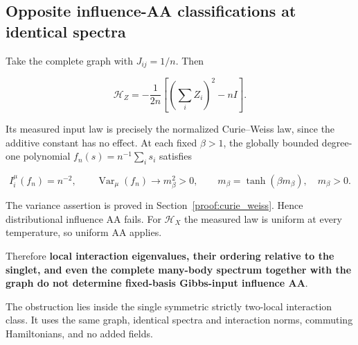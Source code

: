 \subsection{Opposite influence-AA classifications at identical
spectra}\label{quant:sec-3}

Take the complete graph with \(J_{ij}=1/n\). Then

\[
\mathcal H_Z=-\frac1{2n}\left[\left(\sum_iZ_i\right)^2-nI\right].
\]

Its measured input law is precisely the normalized Curie--Weiss law,
since the additive constant has no effect. At each fixed \(\beta>1\),
the globally bounded degree-one polynomial \(f_n(s)=n^{-1}\sum_i s_i\)
satisfies

\[
I_i^\mu(f_n)=n^{-2},\qquad
\operatorname{Var}_\mu(f_n)\longrightarrow m_\beta^2>0,
\qquad m_\beta=\tanh(\beta m_\beta),\quad m_\beta>0.
\]

The variance assertion is proved in
Section~\ref{proof:curie_weiss}. Hence distributional influence AA
fails. For \(\mathcal H_X\) the measured law is uniform at every
temperature, so uniform AA applies.

Therefore \textbf{local interaction eigenvalues, their ordering relative
to the singlet, and even the complete many-body spectrum together with
the graph do not determine fixed-basis Gibbs-input influence AA}.

The obstruction lies inside the single symmetric strictly two-local
interaction class. It uses the same graph, identical spectra and
interaction norms, commuting Hamiltonians, and no added fields.





